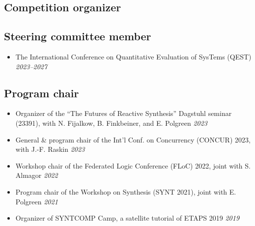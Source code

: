 \documentclass[10pt,a4paper]{moderncv}
\begin{document}
\subsection{Competition organizer}

\subsection{Steering committee member}
\begin{itemize}
  \item The International Conference on Quantitative Evaluation of SysTems
    (QEST) \hfill \textit{2023--2027}
\end{itemize}

\subsection{Program chair}
\begin{itemize}
  \item Organizer of the ``The Futures of Reactive Synthesis'' Dagstuhl
    seminar (23391), with N. Fijalkow, B. Finkbeiner, and E. Polgreen \hfill
    \textit{2023}
  \item General \& program chair of the Int'l Conf. on
    Concurrency (CONCUR) 2023, with J.-F. Raskin \hfill
    \textit{2023}
  \item Workshop chair of the Federated Logic Conference (FLoC) 2022, joint
    with S. Almagor \hfill \textit{2022}
  \item Program chair of the Workshop on Synthesis (SYNT 2021), joint
    with E. Polgreen \hfill \textit{2021}
  \item Organizer of SYNTCOMP Camp, a satellite tutorial of ETAPS 2019
    \hfill \textit{2019}
\end{itemize}
\end{document}
